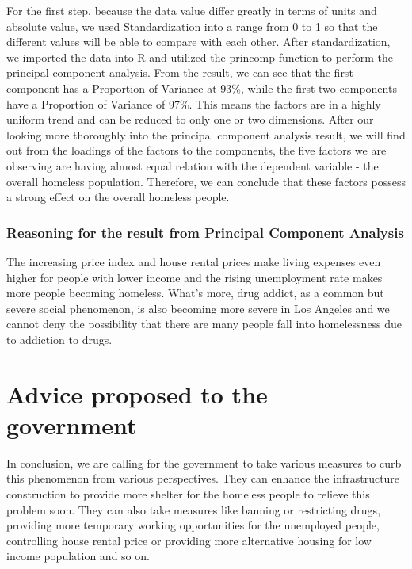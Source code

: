 \documentclass[]{article}
\begin{document}
For the first step, because the data value differ greatly in terms of
units and absolute value, we used Standardization into a range from 0 to
1 so that the different values will be able to compare with each other.
After standardization, we imported the data into R and utilized the
princomp function to perform the principal component analysis. From the
result, we can see that the first component has a Proportion of Variance
at 93\%, while the first two components have a Proportion of Variance of
97\%. This means the factors are in a highly uniform trend and can be
reduced to only one or two dimensions. After our looking more thoroughly
into the principal component analysis result, we will find out from the
loadings of the factors to the components, the five factors we are
observing are having almost equal relation with the dependent variable -
the overall homeless population. Therefore, we can conclude that these
factors possess a strong effect on the overall homeless people.

\hypertarget{reasoning-for-the-result-from-principal-component-analysis}{%
\subsubsection{Reasoning for the result from Principal Component
Analysis}\label{reasoning-for-the-result-from-principal-component-analysis}}

The increasing price index and house rental prices make living expenses
even higher for people with lower income and the rising unemployment
rate makes more people becoming homeless. What's more, drug addict, as a
common but severe social phenomenon, is also becoming more severe in Los
Angeles and we cannot deny the possibility that there are many people
fall into homelessness due to addiction to drugs.

\hypertarget{advice-proposed-to-the-government}{%
\section{Advice proposed to the
government}\label{advice-proposed-to-the-government}}

In conclusion, we are calling for the government to take various
measures to curb this phenomenon from various perspectives. They can
enhance the infrastructure construction to provide more shelter for the
homeless people to relieve this problem soon. They can also take
measures like banning or restricting drugs, providing more temporary
working opportunities for the unemployed people, controlling house
rental price or providing more alternative housing for low income
population and so on.
\end{document}

